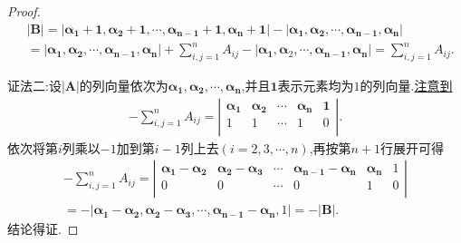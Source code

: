 \documentclass[lang=cn,newtx,10pt,scheme=chinese]{elegantbook}
\begin{document}
\begin{proof}
\begin{align*}
&|\boldsymbol{B}| = |\boldsymbol{\alpha}_{\boldsymbol{1}} + \mathbf{1},\boldsymbol{\alpha}_{\boldsymbol{2}} + \mathbf{1},\cdots,\boldsymbol{\alpha}_{\boldsymbol{n-1}} + \mathbf{1},\boldsymbol{\alpha}_{\boldsymbol{n}} + \mathbf{1}| - |\boldsymbol{\alpha}_{\boldsymbol{1}},\boldsymbol{\alpha}_{\boldsymbol{2}},\cdots,\boldsymbol{\alpha}_{\boldsymbol{n-1}},\boldsymbol{\alpha}_{\boldsymbol{n}}|
\\
&= |\boldsymbol{\alpha}_{\boldsymbol{1}},\boldsymbol{\alpha}_{\boldsymbol{2}},\cdots,\boldsymbol{\alpha}_{\boldsymbol{n-1}},\boldsymbol{\alpha}_{\boldsymbol{n}}| + \sum_{i,j = 1}^{n}A_{ij} - |\boldsymbol{\alpha}_{\boldsymbol{1}},\boldsymbol{\alpha}_2,\cdots,\boldsymbol{\alpha}_{\boldsymbol{n-1}},\boldsymbol{\alpha}_{\boldsymbol{n}}| = \sum_{i,j = 1}^{n}A_{ij}.
\end{align*}

{\color{blue}证法二:}设\(|\boldsymbol{A}|\)的列向量依次为\(\boldsymbol{\alpha}_{\boldsymbol{1}},\boldsymbol{\alpha}_{\boldsymbol{2}},\cdots,\boldsymbol{\alpha}_{\boldsymbol{n}}\),并且\(\mathbf{1}\)表示元素均为\(1\)的列向量.\hyperref[关于行列式|A|所有代数余子式求和的构造]{注意到}
\begin{align*}
-\sum_{i,j=1}^n{A_{ij}}=\left| \begin{matrix}
\boldsymbol{\alpha }_{\mathbf{1}}&		\boldsymbol{\alpha }_{\mathbf{2}}&		\cdots&		\boldsymbol{\alpha }_{\boldsymbol{n}}&		\mathbf{1}\\
1&		1&		\cdots&		1&		0\\
\end{matrix} \right|.
\end{align*}
依次将第$i$列乘以$-1$加到第$i-1$列上去$(i=2,3,\cdots,n)$,再按第$n+1$行展开可得
\begin{align*}
-\sum_{i,j=1}^n{A_{ij}=\left| \begin{matrix}
\boldsymbol{\alpha }_{\mathbf{1}}-\boldsymbol{\alpha }_{\mathbf{2}}&		\boldsymbol{\alpha }_{\mathbf{2}}-\boldsymbol{\alpha }_{\mathbf{3}}&		\cdots&		\boldsymbol{\alpha }_{\boldsymbol{n}-\mathbf{1}}-\boldsymbol{\alpha }_{\boldsymbol{n}}&		\boldsymbol{\alpha }_{\boldsymbol{n}}&		1\\
0&		0&		\cdots&		0&		1&		0\\
\end{matrix} \right|}
\\
=-|\boldsymbol{\alpha }_{\mathbf{1}}-\boldsymbol{\alpha }_{\mathbf{2}},\boldsymbol{\alpha }_{\mathbf{2}}-\boldsymbol{\alpha }_{\mathbf{3}},\cdots ,\boldsymbol{\alpha }_{\boldsymbol{n}-\mathbf{1}}-\boldsymbol{\alpha }_{\boldsymbol{n}},1|=-|\boldsymbol{B}|.
\end{align*}
结论得证.
\end{proof}
\end{document}
